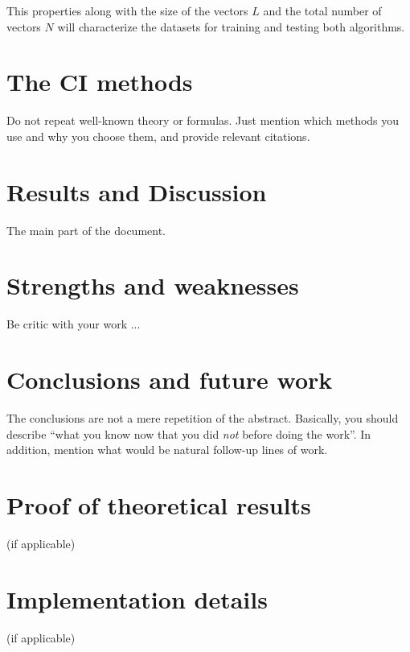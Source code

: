 \documentclass[anon]{CI}
\begin{document}
This properties along with the size of the vectors $L$ and the total number of vectors $N$ will characterize the datasets for training and testing both algorithms.


\section{The CI methods}

Do not repeat well-known theory or formulas. Just mention which methods you use and why you choose them, and provide relevant citations. 

\section{Results and Discussion}

The main part of the document.

\section{Strengths and weaknesses}

Be critic with your work ...

\section{Conclusions and future work}

The conclusions are not a mere repetition of the abstract. Basically, you should describe ``what you know now that you did \emph{not} before doing the work''. In addition, mention what would be natural follow-up lines of work.






\appendix

\section{Proof of theoretical results} (if applicable)

\section{Implementation details} (if applicable)
\end{document}
